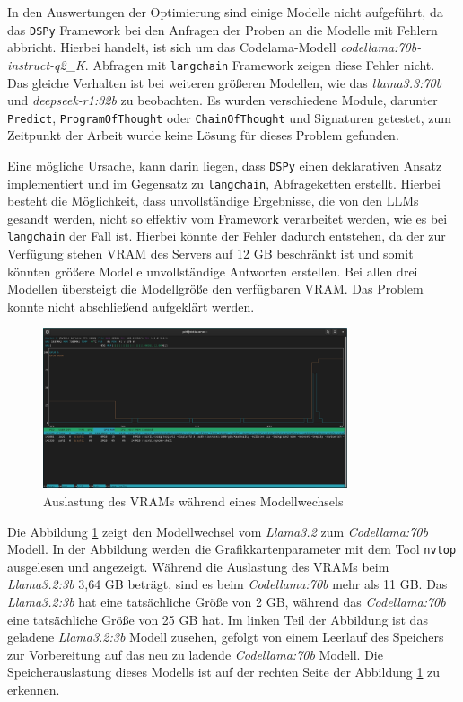 In den Auswertungen der Optimierung sind einige Modelle nicht aufgeführt, da das \texttt{DSPy} Framework bei den Anfragen der Proben an die Modelle mit Fehlern abbricht. Hierbei handelt, ist sich um das Codelama-Modell \textit{codellama:70b-instruct-q2\_K}. Abfragen mit \texttt{langchain} Framework zeigen diese Fehler nicht. Das gleiche Verhalten ist bei weiteren größeren Modellen, wie das \textit{llama3.3:70b} und \textit{deepseek-r1:32b} zu beobachten. Es wurden verschiedene Module, darunter \texttt{Predict}, \texttt{ProgramOfThought} oder \texttt{ChainOfThought} und Signaturen getestet, zum Zeitpunkt der Arbeit wurde keine Lösung für dieses Problem gefunden.\vspace{0.2cm}

Eine mögliche Ursache, kann darin liegen, dass \texttt{DSPy} einen deklarativen Ansatz implementiert und im Gegensatz zu \texttt{langchain}, Abfrageketten erstellt. Hierbei besteht die Möglichkeit, dass unvollständige Ergebnisse, die von den LLMs gesandt werden, nicht so effektiv vom Framework verarbeitet werden, wie es bei \texttt{langchain} der Fall ist. Hierbei könnte der Fehler dadurch entstehen, da der zur Verfügung stehen VRAM des Servers auf 12 GB beschränkt ist und somit könnten größere Modelle unvollständige Antworten erstellen. Bei allen drei Modellen übersteigt die Modellgröße den verfügbaren VRAM.  Das Problem konnte nicht abschließend aufgeklärt werden.\vspace{0.2cm}

\begin{figure}[!ht]
	\includegraphics[width=0.8\textwidth]{content/chapter_lessons_learned/images/nvtop_model_change.eps}
	\centering
	\caption{Auslastung des VRAMs während eines Modellwechsels}
	\label{img:bash_nvtop_model_change}
\end{figure}

Die Abbildung \ref{img:bash_nvtop_model_change} zeigt den Modellwechsel vom \textit{Llama3.2} zum \textit{Codellama:70b} Modell. In der Abbildung werden die Grafikkartenparameter mit dem Tool \texttt{nvtop} ausgelesen und angezeigt. Während die Auslastung des VRAMs beim \textit{Llama3.2:3b} 3,64 GB beträgt, sind es beim \textit{Codellama:70b} mehr als 11 GB. Das \textit{Llama3.2:3b} hat eine tatsächliche Größe von 2 GB, während das \textit{Codellama:70b} eine tatsächliche Größe von 25 GB hat. Im linken Teil der Abbildung ist das geladene \textit{Llama3.2:3b} Modell zusehen, gefolgt von einem Leerlauf des Speichers zur Vorbereitung auf das neu zu ladende \textit{Codellama:70b} Modell. Die Speicherauslastung dieses Modells ist auf der rechten Seite der Abbildung \ref{img:bash_nvtop_model_change} zu erkennen.

